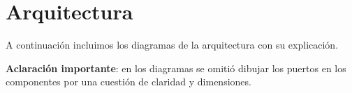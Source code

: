 \section{Arquitectura}

A continuación incluimos los diagramas de la arquitectura con su explicación.

\textbf{Aclaración importante}: en los diagramas se omitió dibujar los puertos en los componentes por una cuestión de claridad y dimensiones.

\newpage


\newpage


\newpage


\newpage


\newpage


\newpage


\newpage


\newpage


\newpage


\newpage


\newpage


\newpage


\newpage


\newpage


